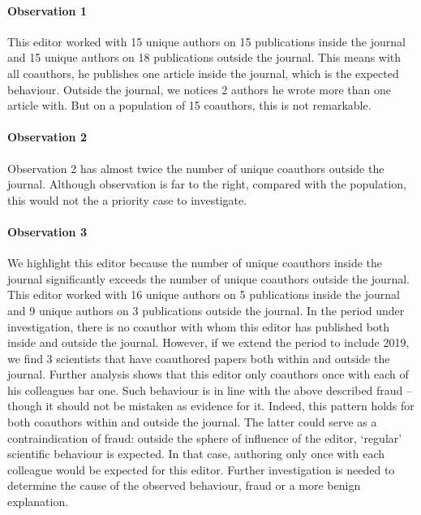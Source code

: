 \documentclass{ou-report}
\begin{document}
\paragraph{Observation 1}
This editor worked with 15 unique authors on 15 publications inside the journal 
and 15 unique authors on 18 publications outside the journal.
This means with all coauthors, he publishes one article inside the journal,
which is the expected behaviour.
Outside the journal, we notices 2 authors he wrote more than one article with. 
But on a population of 15 coauthors, this is not remarkable.


\paragraph{Observation 2}
Observation 2 has almost twice the number of unique coauthors outside the 
journal. Although observation is far to the right, compared with the 
population, this would not the a priority case to investigate.

\paragraph{Observation 3}
We highlight this editor because the number of unique coauthors 
inside the journal significantly exceeds the number of unique coauthors outside 
the journal. 
This editor worked with 16 unique authors on 5 publications inside the journal 
and 9 unique authors on 3 publications outside the journal. In the period under
investigation, there is no coauthor with whom this editor has published both
inside and outside the journal. However, if we extend  the period to include 2019,
we find 3 scientists that have coauthored papers both within and outside the journal.
Further analysis shows that this editor only coauthors once with each of his
colleagues bar one. Such behaviour is in line with the above described fraud  -- though
it should not be mistaken as evidence for it. Indeed, this pattern holds for both
coauthors within and outside the journal. The latter could serve as a contraindication
of fraud: outside the sphere of influence of the editor, `regular' scientific behaviour
is expected. In that case, authoring only once with each colleague would be expected for this
editor. Further investigation is needed to determine the cause of the observed behaviour,
fraud or a more benign explanation.
\end{document}
